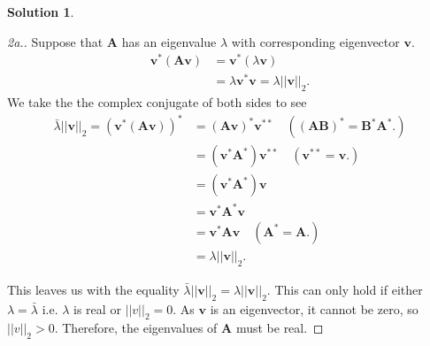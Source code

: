 \documentclass[12pt]{article}
\newcommand{\norm}[1]{ \left|\left| #1 \right|\right| }
\renewcommand{\vec}[1]{\mathbf{#1}}
\theoremstyle{definition}
\newtheorem{sol}{Solution}
\theoremstyle{remark}
\begin{document}
\begin{sol}\leavevmode
    \begin{proof}[2a.]
        Suppose that $\vec{A}$ has an eigenvalue $\lambda$ with corresponding eigenvector $\vec{v}$.
        \begin{align}
            \vec{v}^*(\vec{Av}) &= \vec{v}^*(\lambda \vec{v})\\
                                &= \lambda \vec{v}^*\vec{v} = \lambda \norm{\vec{v}}_2.
        \end{align}
We take the the complex conjugate of both sides to see
\begin{align}
    \bar{\lambda} \norm{\vec{v}}_2 = (\vec{v}^*(\vec{Av}))^* &= (\vec{Av})^*\vec{v}^{**} \quad ((\vec{AB})^* = \vec{B}^*\vec{A}^*.) \\
                            &= (\vec{v}^* \vec{A}^*)\vec{v}^{**} \quad (\vec{v}^{**} = \vec{v}.)\\
                            &= (\vec{v}^* \vec{A}^*)\vec{v} \\
                            &= \vec{v}^*\vec{A}^*\vec{v} \\
                            &= \vec{v}^* \vec{A}\vec{v} \quad ( \vec{A}^* = \vec{A}. )\\
                            &= \lambda \norm{\vec{v}}_2.
\end{align}

This leaves us with the equality $\bar{\lambda}\norm{\vec{v}}_2 = \lambda \norm{\vec{v}}_2$. This can only hold if either $\lambda = \bar{\lambda}$ i.e. $\lambda$ is real or $\norm{v}_2 = 0$. As $\vec{v}$ is an eigenvector, it cannot be zero, so $\norm{v}_2 > 0$. Therefore, the eigenvalues of $\vec{A}$ must be real.
    \end{proof}


\end{sol}
\end{document}

